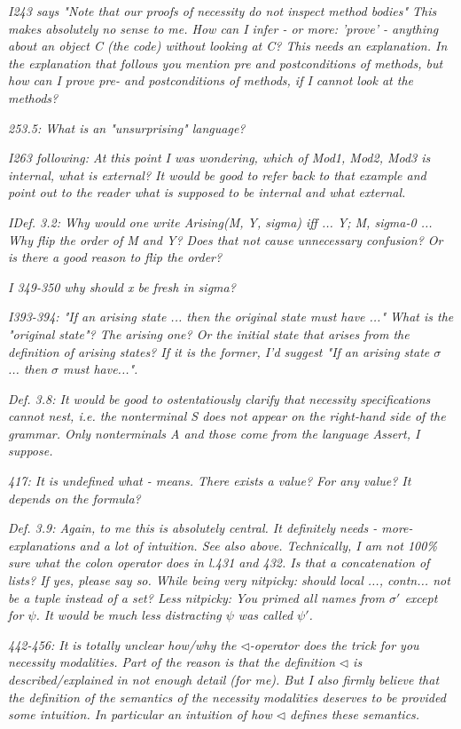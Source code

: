 \documentclass[11pt]{amsart}
\newcommand{\rev}[1]{\emph #1}
\begin{document}
{\rev {{I243 says "Note that our proofs of necessity do not inspect method bodies" This makes absolutely no sense to me. How can I infer - or more: 'prove' - anything about an object C (the code) without looking at C? This needs an explanation. In the explanation that follows you mention pre and postconditions of methods, but how can I prove pre- and postconditions of methods, if I cannot look at the methods? }}}

{\rev {{253.5: What is an "unsurprising" language?}}}

{\rev {{I263 following: At this point I was wondering, which of Mod1, Mod2, Mod3 is internal, what is external? It would be good to refer back to that example and point out to the reader what is supposed to be internal and what external. }}}

 {\rev {{IDef. 3.2: Why would one write Arising(M, Y, sigma) iff ... Y; M, sigma-0 ... Why flip the order of M and Y? Does that not cause unnecessary confusion? Or is there a good reason to flip the order? }}}

{\rev {{I 349-350 why should x be fresh in sigma? }}}

{\rev {{I393-394: "If an arising state ... then the original state must have ..." What is the "original state"? The arising one? Or the initial state that arises from the definition of arising states? If it is the former, I'd suggest "If an arising state $\sigma$ ... then $\sigma$ must have...". }}}

{\rev {{Def. 3.8: It would be good to ostentatiously clarify that necessity specifications cannot nest, i.e. the nonterminal S does not appear on the right-hand side of the grammar. Only nonterminals A and those come from the language Assert, I suppose. }}}

{\rev {{417: It is undefined what  - means. There exists a value? For any value? It depends on the formula? }}}

{\rev {{ Def. 3.9: Again, to me this is absolutely central. It definitely needs - more- explanations and a lot of intuition. See also above. Technically, I am not 100\% sure what the colon operator does in l.431 and 432. Is that a concatenation of lists? If yes, please say so. While being very nitpicky: should {local ..., contn...} not be a tuple instead of a set? Less nitpicky: You primed all names from $\sigma'$ except for $\psi$. It would be much less distracting $\psi$ was called $\psi'$. }}}

{\rev {{442-456: It is totally unclear how/why the $\triangleleft$-operator does the trick for you necessity modalities. Part of the reason is that the definition $\triangleleft$ is described/explained in not enough detail (for me). But I also firmly believe that the definition of the semantics of the necessity modalities deserves to be provided some intuition. In particular an intuition of how $ \triangleleft$ defines these semantics. }}}
\end{document}
